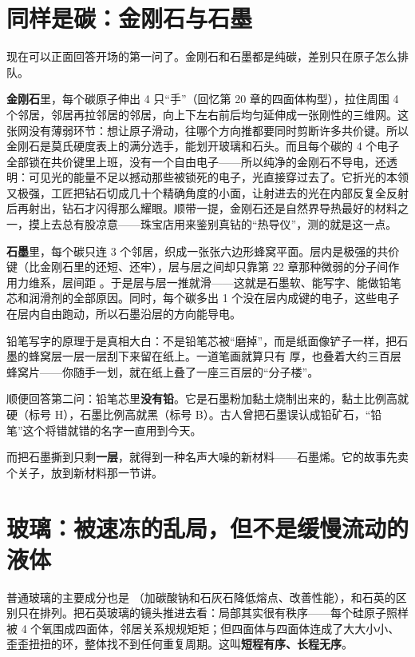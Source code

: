 \section{同样是碳：金刚石与石墨}

现在可以正面回答开场的第一问了。金刚石和石墨都是纯碳，差别只在原子怎么排队。

\textbf{金刚石}里，每个碳原子伸出 4 只“手”（回忆第 20 章的四面体构型），拉住周围 4 个邻居，邻居再拉邻居的邻居，向上下左右前后均匀延伸成一张刚性的三维网。这张网没有薄弱环节：想让原子滑动，往哪个方向推都要同时剪断许多共价键。所以金刚石是莫氏硬度表上的满分选手，能划开玻璃和石头。而且每个碳的 4 个电子全部锁在共价键里上班，没有一个自由电子——所以纯净的金刚石不导电，还透明：可见光的能量不足以撼动那些被锁死的电子，光直接穿过去了。它折光的本领又极强，工匠把钻石切成几十个精确角度的小面，让射进去的光在内部反复全反射后再射出，钻石才闪得那么耀眼。顺带一提，金刚石还是自然界导热最好的材料之一，摸上去总有股凉意——珠宝店用来鉴别真钻的“热导仪”，测的就是这一点。

\textbf{石墨}里，每个碳只连 3 个邻居，织成一张张六边形蜂窝平面。层内是极强的共价键（比金刚石里的还短、还牢），层与层之间却只靠第 22 章那种微弱的分子间作用力维系，层间距 。于是层与层一推就滑——这就是石墨软、能写字、能做铅笔芯和润滑剂的全部原因。同时，每个碳多出 1 个没在层内成键的电子，这些电子在层内自由跑动，所以石墨沿层的方向能导电。

铅笔写字的原理于是真相大白：不是铅笔芯被“磨掉”，而是纸面像铲子一样，把石墨的蜂窝层一层一层刮下来留在纸上。一道笔画就算只有  厚，也叠着大约三百层蜂窝片——你随手一划，就在纸上叠了一座三百层的“分子楼”。

顺便回答第二问：铅笔芯里\textbf{没有铅}。它是石墨粉加黏土烧制出来的，黏土比例高就硬（标号 H），石墨比例高就黑（标号 B）。古人曾把石墨误认成铅矿石，“铅笔”这个将错就错的名字一直用到今天。

而把石墨撕到只剩\textbf{一层}，就得到一种名声大噪的新材料——石墨烯。它的故事先卖个关子，放到新材料那一节讲。

\section{玻璃：被速冻的乱局，但不是缓慢流动的液体}

普通玻璃的主要成分也是 （加碳酸钠和石灰石降低熔点、改善性能），和石英的区别只在排列。把石英玻璃的镜头推进去看：局部其实很有秩序——每个硅原子照样被 4 个氧围成四面体，邻居关系规规矩矩；但四面体与四面体连成了大大小小、歪歪扭扭的环，整体找不到任何重复周期。这叫\textbf{短程有序、长程无序}。

